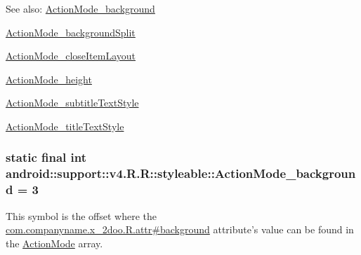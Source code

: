 \begin{Desc}
\item[See also:]\hyperlink{classandroid_1_1support_1_1v4_1_1_r_1_1styleable_a9a053b1676fbd1bb2b4db3234f7a47b}{ActionMode\_\-background} 

\hyperlink{classandroid_1_1support_1_1v4_1_1_r_1_1styleable_8c52d714dfc0ee49d394e2c5f6d4d83c}{ActionMode\_\-backgroundSplit} 

\hyperlink{classandroid_1_1support_1_1v4_1_1_r_1_1styleable_a4f076d47f79c0b695b050ccd1d9089e}{ActionMode\_\-closeItemLayout} 

\hyperlink{classandroid_1_1support_1_1v4_1_1_r_1_1styleable_bc09ebbb71fe7090cc37b98f82c34647}{ActionMode\_\-height} 

\hyperlink{classandroid_1_1support_1_1v4_1_1_r_1_1styleable_8f8b0c324c58b0dcb3f7272911eb5365}{ActionMode\_\-subtitleTextStyle} 

\hyperlink{classandroid_1_1support_1_1v4_1_1_r_1_1styleable_93a05f44280c1708d5a6f3d307415600}{ActionMode\_\-titleTextStyle} \end{Desc}
\hypertarget{classandroid_1_1support_1_1v4_1_1_r_1_1styleable_a9a053b1676fbd1bb2b4db3234f7a47b}{
\subsubsection[{ActionMode\_\-background}]{\setlength{\rightskip}{0pt plus 5cm}static final int android::support::v4.R.R::styleable::ActionMode\_\-background = 3}}
\label{classandroid_1_1support_1_1v4_1_1_r_1_1styleable_a9a053b1676fbd1bb2b4db3234f7a47b}


This symbol is the offset where the \hyperlink{classcom_1_1companyname_1_1x__2doo_1_1_r_1_1attr_fc97d2bd51d655faed306bf08124fc83}{com.companyname.x\_\-2doo.R.attr\#background} attribute's value can be found in the \hyperlink{classandroid_1_1support_1_1v4_1_1_r_1_1styleable_cb0fd98eb07ef010055f95821e8da84e}{ActionMode} array.

